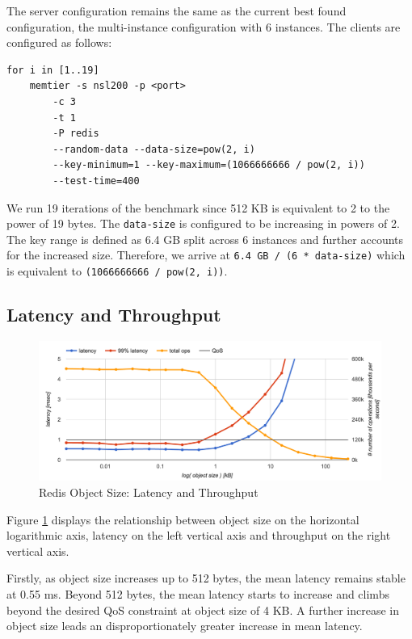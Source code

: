 The server configuration remains the same as the current best found configuration, the multi-instance configuration with 6 instances. The clients are configured as follows:

\begin{lstlisting}
for i in [1..19]
    memtier -s nsl200 -p <port>
        -c 3
        -t 1
        -P redis
        --random-data --data-size=pow(2, i)
        --key-minimum=1 --key-maximum=(1066666666 / pow(2, i))
        --test-time=400
\end{lstlisting}

We run 19 iterations of the benchmark since 512 KB is equivalent to 2 to the power of 19 bytes. The \texttt{data-size} is configured to be increasing in powers of 2. The key range is defined as 6.4 GB split across 6 instances and further accounts for the increased size. Therefore, we arrive at \texttt{6.4 GB / (6 * data-size)} which is equivalent to \texttt{(1066666666 / pow(2, i))}.


\subsection{Latency and Throughput}

\begin{figure}[h]
    \includegraphics[width=\textwidth]{./res/6_object_size_latency_ops.png}
    \caption{Redis Object Size: Latency and Throughput}
    \label{fig:6_object_size_latency_ops.png}
\end{figure}

Figure \ref{fig:6_object_size_latency_ops.png} displays the relationship between object size on the horizontal logarithmic axis, latency on the left vertical axis and throughput on the right vertical axis.

Firstly, as object size increases up to 512 bytes, the mean latency remains stable at 0.55 ms. Beyond 512 bytes, the mean latency starts to increase and climbs beyond the desired QoS constraint at object size of 4 KB. A further increase in object size leads an disproportionately greater increase in mean latency.


